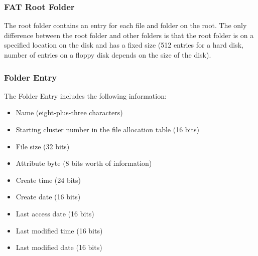 % 
% 
\begin{frame}[fragile]
    \frametitle{FAT Root Folder}
    The root folder contains an entry for each file and folder on the root. The only difference between the root folder and other folders is that {\color{red}the root folder is on a specified location} on the disk and {\color{red}has a fixed size} (512 entries for a hard disk, number of entries on a floppy disk depends on the size of the disk).

\end{frame}
% 
% 
\begin{frame}[fragile]
    \frametitle{Folder Entry}
    The Folder Entry includes the following information:

    \begin{itemize}
        \item Name (eight-plus-three characters)
        \item Starting cluster number in the file allocation table (16 bits)
        \item File size (32 bits) \pause
        \item Attribute byte (8 bits worth of information) \pause
        \item Create time (24 bits)
        \item Create date (16 bits)
        \item Last access date (16 bits)
        \item Last modified time (16 bits)
        \item Last modified date (16 bits)
    \end{itemize}
\end{frame}
